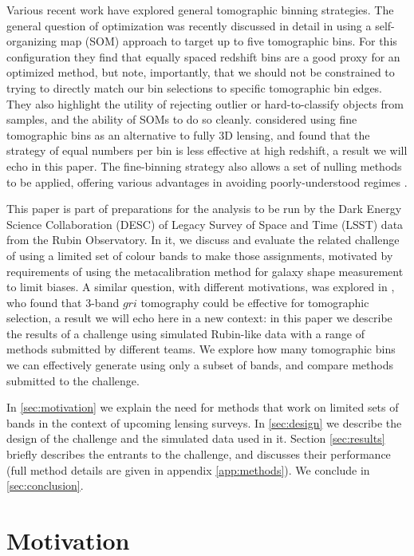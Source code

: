 \documentclass[twocolumn,twocolappendix]{aastex63}
\begin{document}
Various recent work have explored general tomographic binning strategies. The general question of optimization
was recently discussed in detail
in \citet{rainbow} using a self-organizing map (SOM) approach to target up to five tomographic bins.  For this
configuration they find that equally spaced redshift bins are a good proxy
for an optimized method, but note, importantly, that we should not be constrained to trying to directly
match our bin selections to specific tomographic bin edges. 
They also highlight the utility of rejecting outlier or hard-to-classify objects from samples, and the ability of SOMs
to do so cleanly.
\citet{taylor18} considered using
fine tomographic bins as an alternative to fully 3D lensing, and found that the strategy of equal numbers
per bin is less effective at high redshift, a result we will echo in this paper. The fine-binning strategy
also allows a set of nulling methods to be applied, offering various advantages in avoiding poorly-understood
regimes \citep{taylor18b,bnt,xcut}.

This paper is part of preparations for the analysis to be run by the Dark Energy Science Collaboration (DESC) of Legacy Survey of Space and Time (LSST) data from the Rubin Observatory.
In it, we discuss and evaluate the related challenge
of using a limited set of colour bands to make those assignments, motivated by requirements of using the
metacalibration method for galaxy shape measurement to limit biases.  
A similar question, with different motivations, was explored in \citet{jain}, who found that 3-band 
$gri$ tomography could be effective for tomographic selection, a result we will echo here in a new context: in this paper we describe the results of a 
challenge using simulated Rubin-like data with a range of methods submitted by different teams.  We explore how many tomographic bins we can effectively generate using only a subset of bands, and compare methods submitted to the challenge.

In \autoref{sec:motivation} we explain the need for methods that work on limited sets of bands in the context of upcoming lensing surveys. In \autoref{sec:design} we describe the design of the challenge and the simulated data used in it.
Section \ref{sec:results} briefly describes the entrants to the challenge, and discusses their performance (full
method details are given in appendix \ref{app:methods}).
 We conclude in \autoref{sec:conclusion}.

\section{Motivation}
\label{sec:motivation}
\end{document}
